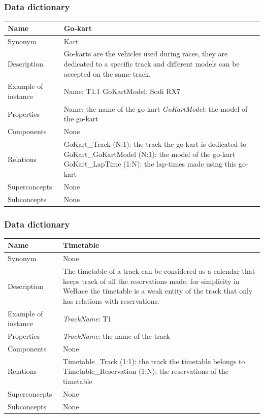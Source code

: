 \documentclass{beamer}
\newcommand{\kc}{WeRace}
\begin{document}
\begin{frame}
\frametitle{Data dictionary}
\begin{table}
\tiny
\begin{tabular}{|p{2cm}|p{6cm}|}
\hline
Name & \textbf{Go-kart} \\
\hline
Synonym & Kart \\
\hline
Description & Go-karts are the vehicles used 
during races, they are dedicated to a specific track
and different models can be accepted on the same track. \\
\hline
Example of instance &
Name: T1.1 \newline
GoKartModel: Sodi RX7 \\
\hline
Properties &
Name: the name of the go-kart \newline
\textit{GoKartModel}: the model of the go-kart \\
\hline
Components & None \\
\hline
Relations &
GoKart\_Track (N:1): the track the go-kart is dedicated to \newline
GoKart\_GoKartModel (N:1): the model of the go-kart \newline
GoKart\_LapTime (1:N): the lap-times made using this go-kart \\
\hline
Superconcepts & None \\
\hline
Subconcepts & None \\
\hline
\end{tabular}
\end{table}
\end{frame}

\begin{frame}
\frametitle{Data dictionary}
\begin{table}
\tiny
\begin{tabular}{|p{2cm}|p{6cm}|}
\hline
Name & \textbf{Timetable} \\
\hline
Synonym & None \\
\hline
Description & The timetable of a track can be considered
as a calendar that keeps track of all the reservations made,
for simplicity in \kc{} the timetable is a weak entity of the track
that only has relations with reservations. \\
\hline
Example of instance &
\textit{TrackName}: T1 \\
\hline
Properties &
\textit{TrackName}: the name of the track \\
\hline
Components & None \\
\hline
Relations &
Timetable\_Track (1:1): the track the timetable belongs to \newline
Timetable\_Reservation (1:N): the reservations of the timetable \\
\hline
Superconcepts & None \\
\hline
Subconcepts & None \\
\hline
\end{tabular}
\end{table}
\end{frame}
\end{document}
